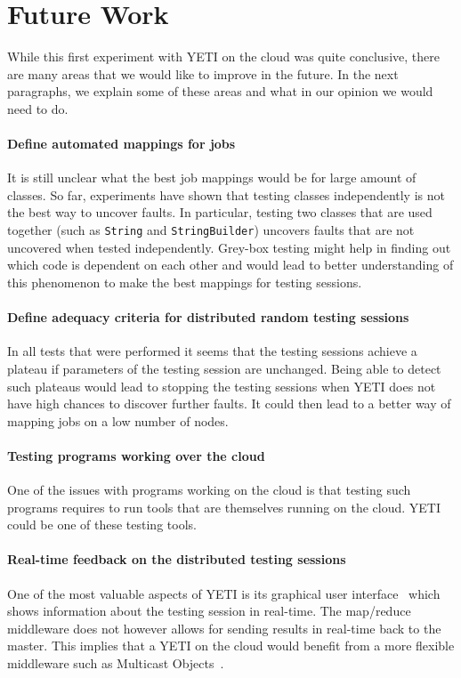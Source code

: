 \section{Future Work}\label{sec:future}

While this first experiment with YETI on the cloud was quite 
conclusive, there are many areas that we would like to improve 
in the future. In the next paragraphs, we explain some of these 
areas and what in our opinion we would need to do.

\paragraph{Define automated mappings for jobs}
It is still unclear what the best job mappings would be for large 
amount of classes. So far, experiments have shown that testing classes
independently is not the best way to uncover faults. In particular, 
testing two classes that are used together (such as \texttt{String} and 
\texttt{StringBuilder}) uncovers faults that are not uncovered when tested 
independently. Grey-box testing might help in finding out which code is dependent 
on each other and would lead to better understanding of this phenomenon to make
the best mappings for testing sessions.

\paragraph{Define adequacy criteria for distributed random testing sessions}
In all tests that were performed it seems that the testing sessions
achieve a plateau if parameters of the testing session are unchanged. 
Being able to detect such plateaus would lead to stopping the testing sessions
when YETI does not have high chances to discover further faults. It could then
lead to a better way of mapping jobs on a low number of nodes.


\paragraph{Testing programs working over the cloud}
One of the issues with programs working on the cloud is that testing such 
programs requires to run tools that are themselves running on the cloud.
YETI could be one of these testing tools.


\paragraph{Real-time feedback on the distributed testing sessions}
One of the most valuable aspects of YETI is its graphical user interface~\cite{} 
which shows information about the testing session in real-time. The 
map/reduce middleware does not however allows for sending results in real-time
back to the master. This implies that a YETI on the cloud would benefit from a more 
flexible middleware such as Multicast Objects~\cite{}.
